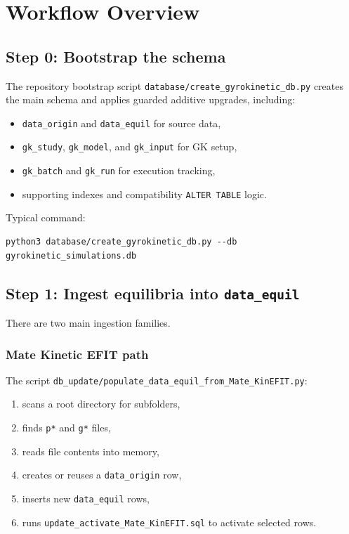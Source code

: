 \documentclass[11pt]{article}
\newcommand{\code}[1]{\texttt{#1}}
\begin{document}
\section{Workflow Overview}

\subsection{Step 0: Bootstrap the schema}

The repository bootstrap script
\code{database/create\_gyrokinetic\_db.py} creates the main schema and applies
guarded additive upgrades, including:

\begin{itemize}
\item \code{data\_origin} and \code{data\_equil} for source data,
\item \code{gk\_study}, \code{gk\_model}, and \code{gk\_input} for GK setup,
\item \code{gk\_batch} and \code{gk\_run} for execution tracking,
\item supporting indexes and compatibility \code{ALTER TABLE} logic.
\end{itemize}

Typical command:

\begin{verbatim}
python3 database/create_gyrokinetic_db.py --db gyrokinetic_simulations.db
\end{verbatim}

\subsection{Step 1: Ingest equilibria into \code{data\_equil}}

There are two main ingestion families.

\subsubsection{Mate Kinetic EFIT path}

The script \code{db\_update/populate\_data\_equil\_from\_Mate\_KinEFIT.py}:

\begin{enumerate}
\item scans a root directory for subfolders,
\item finds \code{p*} and \code{g*} files,
\item reads file contents into memory,
\item creates or reuses a \code{data\_origin} row,
\item inserts new \code{data\_equil} rows,
\item runs \code{update\_activate\_Mate\_KinEFIT.sql} to activate selected rows.
\end{enumerate}
\end{document}
